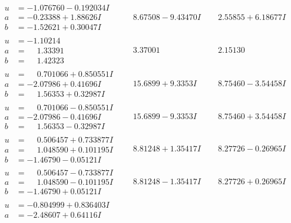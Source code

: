 \documentclass[1p]{elsarticle_modified}
\theoremstyle{definition}
\begin{document}
$$\begin{array}{c|c|c}
\begin{aligned}
u &= -1.076760 - 0.192034 I \\
a &= -0.23388 + 1.88626 I \\
b &= -1.52621 + 0.30047 I\end{aligned}
 & \phantom{-}8.67508 - 9.43470 I & \phantom{-}2.55855 + 6.18677 I \\ \hline\begin{aligned}
u &= -1.10214\phantom{ +0.000000I} \\
a &= \phantom{-}1.33391\phantom{ +0.000000I} \\
b &= \phantom{-}1.42323\phantom{ +0.000000I}\end{aligned}
 & \phantom{-}3.37001\phantom{ +0.000000I} & \phantom{-}2.15130\phantom{ +0.000000I} \\ \hline\begin{aligned}
u &= \phantom{-}0.701066 + 0.850551 I \\
a &= -2.07986 + 0.41696 I \\
b &= \phantom{-}1.56353 + 0.32987 I\end{aligned}
 & \phantom{-}15.6899 + 9.3353 I & \phantom{-}8.75460 - 3.54458 I \\ \hline\begin{aligned}
u &= \phantom{-}0.701066 - 0.850551 I \\
a &= -2.07986 - 0.41696 I \\
b &= \phantom{-}1.56353 - 0.32987 I\end{aligned}
 & \phantom{-}15.6899 - 9.3353 I & \phantom{-}8.75460 + 3.54458 I \\ \hline\begin{aligned}
u &= \phantom{-}0.506457 + 0.733877 I \\
a &= \phantom{-}1.048590 + 0.101195 I \\
b &= -1.46790 - 0.05121 I\end{aligned}
 & \phantom{-}8.81248 + 1.35417 I & \phantom{-}8.27726 - 0.26965 I \\ \hline\begin{aligned}
u &= \phantom{-}0.506457 - 0.733877 I \\
a &= \phantom{-}1.048590 - 0.101195 I \\
b &= -1.46790 + 0.05121 I\end{aligned}
 & \phantom{-}8.81248 - 1.35417 I & \phantom{-}8.27726 + 0.26965 I \\ \hline\begin{aligned}
u &= -0.804999 + 0.836403 I \\
a &= -2.48607 + 0.64116 I \\

\end{aligned}
\end{array}$$
\end{document}
